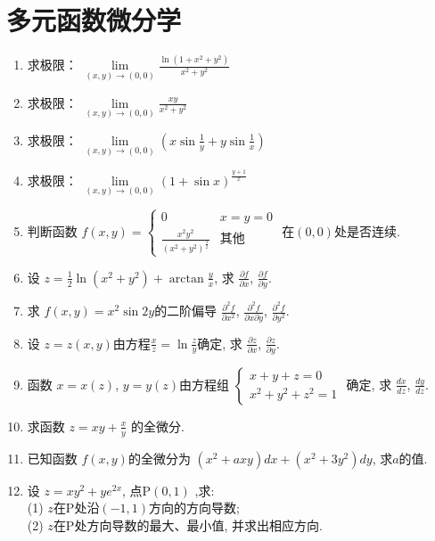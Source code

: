 \newpage

\section{多元函数微分学}
\begin{enumerate}
	\item 求极限： $\lim\limits_{(x,y) \to (0,0)} \frac{\ln(1+x^2+y^2)}{x^2+y^2}$ 

	\item 求极限： $\lim\limits_{(x,y) \to (0,0)} \frac{xy}{x^2+y^2}$

	\item 求极限： $\lim\limits_{(x,y) \to (0,0)} \left(x\sin\frac{1}{y} + y\sin\frac{1}{x}\right)$ 

	\item 求极限： $\lim\limits_{(x,y) \to (0,0)} (1+\sin x)^{\frac{y+1}{x}}$
	
	\item 判断函数 $f(x,y)=\begin{cases} 0 & x=y=0 \\ \frac{x^2y^2}{(x^2+y^2)^{\frac{3}{2}}} & \text{其他} \end{cases}$ 在$(0,0)$处是否连续.

	
	\item 设 $z=\frac{1}{2}\ln (x^2+y^2)+\arctan \frac{y}{x}$, 求 $\frac{\partial f}{\partial x}$, $\frac{\partial f}{\partial y}$.

	\item 求 $f(x,y) = x^2 \sin 2y$的二阶偏导 $\frac{\partial^2 f}{\partial x^2}$, $\frac{\partial^2 f}{\partial x \partial y}$, $\frac{\partial^2 f}{\partial y^2}$.

	\item 设 $z = z(x,y)$由方程$\frac{x}{z}=\ln \frac{z}{y}$确定, 求 $\frac{\partial z}{\partial x}$, $\frac{\partial z}{\partial y}$.

	\item 函数 $x = x(z)$, $y = y(z)$由方程组 $\begin{cases} x+y+z=0 \\ x^2+y^2+z^2=1 \end{cases}$ 确定, 求 $\frac{dx}{dz}$, $\frac{dy}{dz}$.

	\item 求函数 $z = xy + \frac{x}{y}$ 的全微分.

	
	\item 已知函数 $f(x,y)$的全微分为 $(x^2+axy)dx + (x^2+3y^2)dy$, 求$a$的值.

	\item 设 $z=xy^2+ye^{2x}$, 点P$(0,1)$ ,求:\\
	(1) $z$在P处沿$(-1,1)$方向的方向导数; \\ (2) $z$在P处方向导数的最大、最小值, 并求出相应方向.


\end{enumerate}
